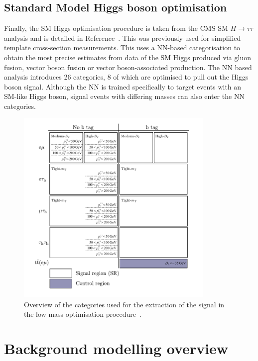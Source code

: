 \subsection{Standard Model Higgs boson optimisation}

Finally, the \ac{SM} Higgs optimisation procedure is taken from the \ac{CMS} \ac{SM} $H \rightarrow \tau\tau$ analysis and is detailed in Reference~\cite{CMS:2022kdi}.
This was previously used for simplified template cross-section measurements.
This uses a \ac{NN}-based categorisation to obtain the most precise estimates from data of the \ac{SM} Higgs produced via gluon fusion, vector boson fusion or vector boson-associated production.
The \ac{NN} based analysis introduces 26 categories, 8 of which are optimised to pull out the Higgs boson signal.
Although the \ac{NN} is trained specifically to target events with an \ac{SM}-like Higgs boson, signal events with differing masses can also enter the \ac{NN} categories.

\begin{figure}[!hbtp]
\centering
    \includegraphics[width=0.85\textwidth]{Figures/low_mass_categories.pdf}
\caption[Diagram of the categories in the low-mass optimisation procedure.]{Overview of the categories used for the extraction of the signal in the low mass optimisation procedure~\cite{CMS:2022rbd}.}
\label{fig:low_mass_categories}
\end{figure}

\section{Background modelling overview}
\label{sec:background_modelling}

